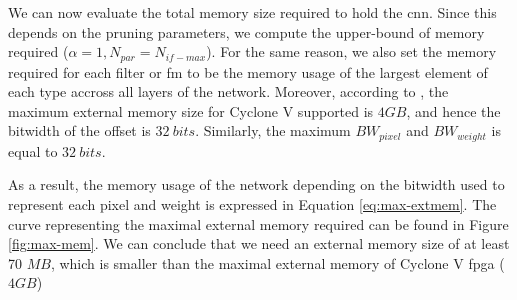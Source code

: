 We can now evaluate the total memory size required to hold the \acrshort{cnn}. Since this depends on the pruning parameters, we compute the upper-bound of memory required ($\alpha = 1, N_{par} = N_{if-max}$). For the same reason, we also set the memory required for each filter or \acrshort{fm} to be the memory usage of the largest element of each type accross all layers of the network. Moreover, according to \cite{noauthor_cyclone_nodate}, the maximum external memory size for Cyclone V supported is $4GB$, and hence the bitwidth of the offset is $32 \ bits$. Similarly, the maximum $BW_{pixel}$ and $BW_{weight}$ is equal to $32 \ bits$.

As a result, the memory usage of the network depending on the bitwidth used to represent each pixel and weight is expressed in Equation \eqref{eq:max-extmem}.
The curve representing the maximal external memory required can be found in Figure \ref{fig:max-mem}. We can conclude that we need an external memory size of at least 70 $MB$, which is smaller than the maximal external memory of Cyclone V \acrshort{fpga} ($4 GB$)


